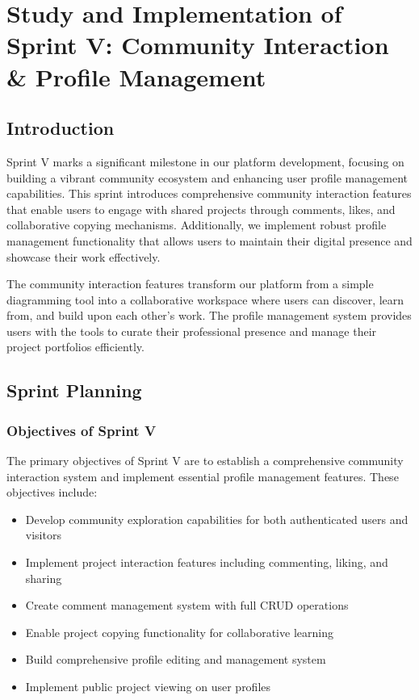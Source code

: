 \chapter[Sprint V]{Study and Implementation of Sprint V: Community Interaction \& Profile Management}

\minitoc

\section{Introduction}

Sprint V marks a significant milestone in our platform development, focusing on building a vibrant community ecosystem and enhancing user profile management capabilities. This sprint introduces comprehensive community interaction features that enable users to engage with shared projects through comments, likes, and collaborative copying mechanisms. Additionally, we implement robust profile management functionality that allows users to maintain their digital presence and showcase their work effectively.

The community interaction features transform our platform from a simple diagramming tool into a collaborative workspace where users can discover, learn from, and build upon each other's work. The profile management system provides users with the tools to curate their professional presence and manage their project portfolios efficiently.

\section{Sprint Planning}

\subsection{Objectives of Sprint V}

The primary objectives of Sprint V are to establish a comprehensive community interaction system and implement essential profile management features. These objectives include:

\begin{itemize}
\item Develop community exploration capabilities for both authenticated users and visitors
\item Implement project interaction features including commenting, liking, and sharing
\item Create comment management system with full CRUD operations
\item Enable project copying functionality for collaborative learning
\item Build comprehensive profile editing and management system
\item Implement public project viewing on user profiles
\end{itemize}

